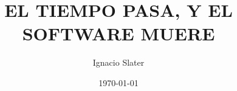 \title{EL TIEMPO PASA, Y EL SOFTWARE MUERE}

\author{Ignacio Slater}
\newcommand{\subtitle}{Cómo diseñar programas resistentes al cambio}

\date{\today}


\newtheorem{theorem}{Theorem}
\newtheorem*{note}{Nota}
\newtheorem*{important}{Importante}
\theoremstyle{definition}
\newtheorem{definition}{Definition}[chapter]
\newtheorem{exercise}[definition]{Ejercicio}

\makeatletter
   \let\@epipart\@endpart
   \renewcommand{\@endpart}{\thispagestyle{epigraph}\@epipart}
\makeatother        
 
\setlength\epigraphwidth{\textwidth}

\newcommand{\java}[1]{\texttt{#1}}

